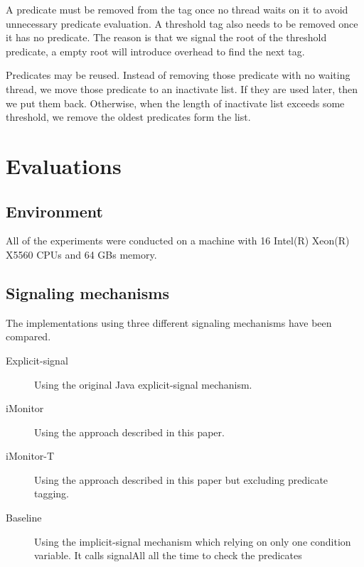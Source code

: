 \documentclass[preprint]{sigplanconf}
\begin{document}
A predicate must be removed from the tag once no thread waits on 
it to avoid unnecessary predicate evaluation. A threshold tag also needs to be
removed once it has no predicate. The reason is that 
we signal the root of the threshold predicate, a empty root 
will introduce overhead to find the next tag. 

Predicates may be reused. Instead  of removing those predicate with no waiting
thread, 
we move those predicate to an inactivate list. If they are used later, then we 
put them back. Otherwise, when the length of inactivate list exceeds some 
threshold, we remove the oldest predicates form the list.


\section{Evaluations} \label{sec:eval}
\subsection{Environment}
All of the experiments were conducted on a machine with 16 
Intel(R) Xeon(R) X5560 CPUs and 64 GBs memory. 


\subsection{Signaling mechanisms}
The implementations using three different signaling mechanisms have been 
compared. 
\begin{description}
    \item[Explicit-signal] Using the original Java explicit-signal mechanism. 
    \item[iMonitor] Using the approach described in this paper. 
    \item[iMonitor-T] Using the approach described in this paper but excluding
        predicate tagging. 
    \item[Baseline] Using the implicit-signal mechanism which relying on only
        one condition variable. It calls signalAll all the time to check the
        predicates
\end{description}
\end{document}
